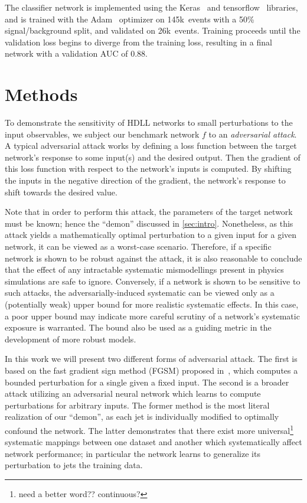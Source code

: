 \documentclass[reprint,nofootinbib,...]{revtex4-1}
\newcommand{\ntrain}{145k}       %
\newcommand{\nval}{26k}            %
\newcommand{\aucCLS}{0.88}    %
\begin{document}
The classifier network is implemented using the Keras~\cite{keras} and tensorflow~\cite{tensorflow} libraries, and is trained with the Adam~\cite{adam} optimizer on \ntrain\ events with a 50\% signal/background split, and validated on \nval\ events.
Training proceeds until the validation loss begins to diverge from the training loss, resulting in a final network with a validation AUC of \aucCLS.

\section{Methods}
To demonstrate the sensitivity of HDLL networks to small perturbations to the input observables, we subject our benchmark network $f$ to an \textit{adversarial attack}.
A typical adversarial attack works by defining a loss function between the target network's response to some input(s) and the desired output.
Then the gradient of this loss function with respect to the network's inputs is computed.
By shifting the inputs in the negative direction of the gradient, the network's response to shift towards the desired value.

Note that in order to perform this attack, the parameters of the target network must be known; hence the ``demon'' discussed in \ref{sec:intro}.
Nonetheless, as this attack yields a mathematically optimal perturbation to a given input for a given network, it can be viewed as a worst-case scenario.
Therefore, if a specific network is shown to be robust against the attack, it is also reasonable to conclude that the effect of any intractable systematic mismodellings present in physics simulations are safe to ignore.
Conversely, if a network is shown to be sensitive to such attacks, the adversarially-induced systematic can be viewed only as a (potentially weak) upper bound for more realistic systematic effects.
In this case, a poor upper bound may indicate more careful scrutiny of a network's systematic exposure is warranted.
The bound also be used as a guiding metric in the development of more robust models.

In this work we will present two different forms of adversarial attack.
The first is based on the fast gradient sign method (FGSM) proposed in~\cite{DBLP:journals/corr/GoodfellowSS14}, which computes a bounded perturbation for a single given a fixed input.
The second is a broader attack utilizing an adversarial neural network which learns to compute perturbations for arbitrary inputs.
The former method is the most literal realization of our ``demon'', as each jet is individually modified to optimally confound the network.
The latter demonstrates that there exist more universal\footnote{need a better word?? continuous?} systematic mappings between one dataset and another which systematically affect network performance; in particular the network learns to generalize its perturbation to jets the training data.
\end{document}
